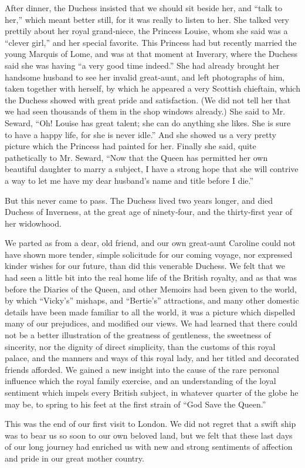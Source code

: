 \documentclass[12pt]{book}
\begin{document}
After dinner, the Duchess insisted that we should sit beside her, and “talk to
her,” which meant better still, for it was really to listen to her. She talked very
prettily about her royal grand‐niece, the Princess Louise, whom she said was a
“clever girl,” and her special favorite. This Princess had but recently married the
young Marquis of Lome, and was at that moment at Inverary, where the Duchess
said she was having “a very good time indeed.” She had already brought her
handsome husband to see her invalid great‐aunt, and left photographs of him,
taken together with herself, by which he appeared a very Scottish chieftain, which
the Duchess showed with great pride and satisfaction. (We did not tell her that
we had seen thousands of them in the shop windows already.) She said to Mr.
Seward, “Oh! Louise has great talent; she can do anything she likes. She is sure to
have a happy life, for she is never idle.” And she showed us a very pretty picture
which the Princess had painted for her. Finally she said, quite pathetically to Mr.
Seward, “Now that the Queen has permitted her own beautiful daughter to marry
a subject, I have a strong hope that she will contrive a way to let me have my
dear husband’s name and title before I die.”

But this never came to pass. The Duchess lived two years longer, and died
Duchess of Inverness, at the great age of ninety‐four, and the thirty‐first year of
her widowhood.

We parted as from a dear, old friend, and our own great‐aunt Caroline could not
have shown more tender, simple solicitude for our coming voyage, nor expressed
kinder wishes for our future, than did this venerable Duchess. We felt that we
had seen a little bit into the real home life of the British royalty, and as that was
before the Diaries of the Queen, and other Memoirs had been given to the world,
by which “Vicky’s” mishaps, and “Bertie’s” attractions, and many other domestic
details have been made familiar to all the world, it was a picture which dispelled
many of our prejudices, and modified our views. We had learned that there
could not be a better illustration of the greatness of gentleness, the sweetness of
sincerity, nor the dignity of direct simplicity, than the customs of this royal palace,
and the manners and ways of this royal lady, and her titled and decorated friends
afforded. We gained a new insight into the cause of the rare personal influence
which the royal family exercise, and an understanding of the loyal sentiment
which impels every British subject, in whatever quarter of the globe he may be,
to spring to his feet at the first strain of “God Save the Queen.”

This was the end of our first visit to London. We did not regret that a swift
ship was to bear us so soon to our own beloved land, but we felt that these last
days of our long journey had enriched us with new and strong sentiments of
affection and pride in our great mother country.
\end{document}
